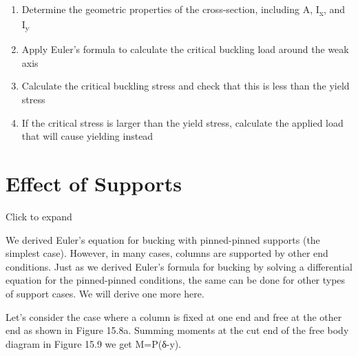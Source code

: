 \documentclass[
  letterpaper,
  DIV=11,
  numbers=noendperiod]{scrreprt}
\theoremstyle{definition}
\theoremstyle{remark}
\begin{document}
\begin{tcolorbox}[enhanced jigsaw, leftrule=.75mm, colbacktitle=quarto-callout-warning-color!10!white, breakable, opacityback=0, colback=white, titlerule=0mm, toprule=.15mm, colframe=quarto-callout-warning-color-frame, coltitle=black, title={Step-by-step: Buckling of pin-supported columns}, toptitle=1mm, bottomrule=.15mm, rightrule=.15mm, left=2mm, arc=.35mm, opacitybacktitle=0.6, bottomtitle=1mm]

\begin{enumerate}
\def\labelenumi{\arabic{enumi}.}
\item
  Determine the geometric properties of the cross-section, including A,
  I\textsubscript{x}, and I\textsubscript{y}
\item
  Apply Euler's formula to calculate the critical buckling load around
  the weak axis
\item
  Calculate the critical buckling stress and check that this is less
  than the yield stress
\item
  If the critical stress is larger than the yield stress, calculate the
  applied load that will cause yielding instead
\end{enumerate}

\end{tcolorbox}

\section{Effect of Supports}\label{sec-15.2}

Click to expand

We derived Euler's equation for bucking with pinned-pinned supports (the
simplest case). However, in many cases, columns are supported by other
end conditions. Just as we derived Euler's formula for bucking by
solving a differential equation for the pinned-pinned conditions, the
same can be done for other types of support cases. We will derive one
more here.

Let's consider the case where a column is fixed at one end and free at
the other end as shown in Figure 15.8a. Summing moments at the cut end
of the free body diagram in Figure 15.9 we get M=P(δ-y).
\end{document}
